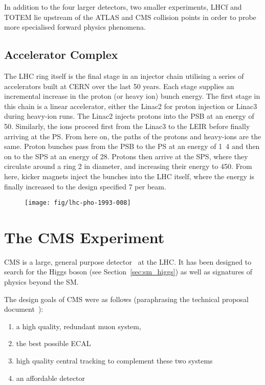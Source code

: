In addition to the four larger detectors, two smaller experiments, \ac{LHCf} and
\ac{TOTEM} lie upstream of the \ac{ATLAS} and \ac{CMS} collision points in order
to probe more specialised forward physics phenomena.

\subsection{Accelerator Complex}
The \ac{LHC} ring itself is the final stage in an injector chain utilising a
series of accelerators built at CERN over the last 50 years. Each stage supplies
an incremental increase in the proton (or heavy ion) bunch energy. The first
stage in this chain is a linear accelerator, either the Linac2 for proton
injection or Linac3 during heavy-ion runs. The Linac2 injects protons into the
\ac{PSB} at an energy of \unit{50}{\mega\electronvolt}. Similarly, the ions
proceed first from the Linac3 to the \ac{LEIR} before finally arriving at the
\ac{PS}. From here on, the paths of the protons and heavy-ions are the
same. Proton bunches pass from the \ac{PSB} to the \ac{PS} at an energy of
\unit{1.4}{\giga\electronvolt} and then on to the \ac{SPS} at an energy of
\unit{28}{\giga\electronvolt}. Protons then arrive at the \ac{SPS}, where they
circulate around a ring \unit{2}{\kilo\metre} in diameter, and increasing their
energy to \unit{450}{\giga\electronvolt}. From here, kicker magnets inject the
bunches into the \ac{LHC} itself, where the energy is finally increased to the
design specified \unit{7}{\TeV} per beam.
\begin{figure}
\texttt{[image: fig/lhc-pho-1993-008]}
\end{figure}




\section{The \acl{CMS} Experiment}
\label{sec:cms}
\ac{CMS} is a large, general purpose detector~\cite{cms_jinst} at the
\ac{LHC}. It has been designed to search for the Higgs boson (see
Section~\ref{sec:sm_higgs}) as well as signatures of physics beyond the \ac{SM}.

The design goals of CMS were as follows (paraphrasing the technical proposal
document~\cite{cms_technical_proposal}):
\begin{enumerate}
\item a high quality, redundant muon system,
\item the best possible \ac{ECAL}
\item high quality central tracking to complement these two systems
\item an affordable detector
\end{enumerate}

